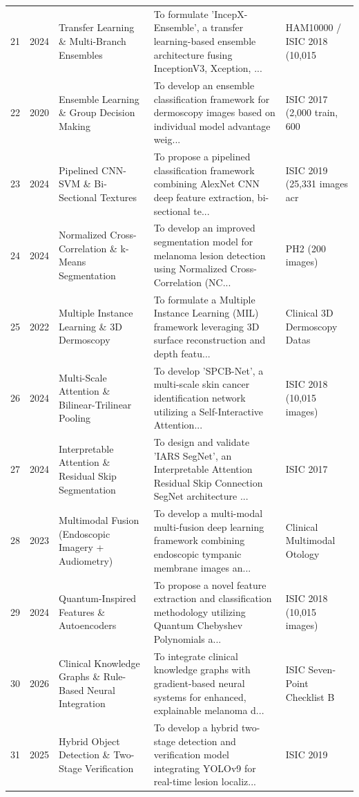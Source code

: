 \documentclass[10pt,a4paper]{article}
\begin{document}
\begin{longtable}{p{0.6cm} p{1.2cm} p{3.2cm} p{7.0cm} p{2.8cm}}
21 & 2024 & Transfer Learning \& Multi-Branch Ensembles & To formulate 'IncepX-Ensemble', a transfer learning-based ensemble architecture fusing InceptionV3, Xception, ... & HAM10000 / ISIC 2018 (10,015 \\
22 & 2020 & Ensemble Learning \& Group Decision Making & To develop an ensemble classification framework for dermoscopy images based on individual model advantage weig... & ISIC 2017 (2,000 train, 600  \\
23 & 2024 & Pipelined CNN-SVM \& Bi-Sectional Textures & To propose a pipelined classification framework combining AlexNet CNN deep feature extraction, bi-sectional te... & ISIC 2019 (25,331 images acr \\
24 & 2024 & Normalized Cross-Correlation \& k-Means Segmentation & To develop an improved segmentation model for melanoma lesion detection using Normalized Cross-Correlation (NC... & PH2 (200 images) \\
25 & 2022 & Multiple Instance Learning \& 3D Dermoscopy & To formulate a Multiple Instance Learning (MIL) framework leveraging 3D surface reconstruction and depth featu... & Clinical 3D Dermoscopy Datas \\
26 & 2024 & Multi-Scale Attention \& Bilinear-Trilinear Pooling & To develop 'SPCB-Net', a multi-scale skin cancer identification network utilizing a Self-Interactive Attention... & ISIC 2018 (10,015 images) \\
27 & 2024 & Interpretable Attention \& Residual Skip Segmentation & To design and validate 'IARS SegNet', an Interpretable Attention Residual Skip Connection SegNet architecture ... & ISIC 2017 \\
28 & 2023 & Multimodal Fusion (Endoscopic Imagery + Audiometry) & To develop a multi-modal multi-fusion deep learning framework combining endoscopic tympanic membrane images an... & Clinical Multimodal Otology  \\
29 & 2024 & Quantum-Inspired Features \& Autoencoders & To propose a novel feature extraction and classification methodology utilizing Quantum Chebyshev Polynomials a... & ISIC 2018 (10,015 images) \\
30 & 2026 & Clinical Knowledge Graphs \& Rule-Based Neural Integration & To integrate clinical knowledge graphs with gradient-based neural systems for enhanced, explainable melanoma d... & ISIC Seven-Point Checklist B \\
31 & 2025 & Hybrid Object Detection \& Two-Stage Verification & To develop a hybrid two-stage detection and verification model integrating YOLOv9 for real-time lesion localiz... & ISIC 2019 \\

\end{longtable}
\end{document}
